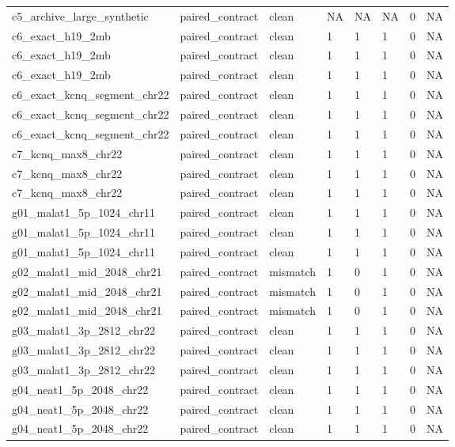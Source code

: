 \begin{tabular}{llllllll}
c5\_archive\_large\_synthetic & paired\_contract & clean & NA & NA & NA & 0 & NA \\
c6\_exact\_h19\_2mb & paired\_contract & clean & 1 & 1 & 1 & 0 & NA \\
c6\_exact\_h19\_2mb & paired\_contract & clean & 1 & 1 & 1 & 0 & NA \\
c6\_exact\_h19\_2mb & paired\_contract & clean & 1 & 1 & 1 & 0 & NA \\
c6\_exact\_kcnq\_segment\_chr22 & paired\_contract & clean & 1 & 1 & 1 & 0 & NA \\
c6\_exact\_kcnq\_segment\_chr22 & paired\_contract & clean & 1 & 1 & 1 & 0 & NA \\
c6\_exact\_kcnq\_segment\_chr22 & paired\_contract & clean & 1 & 1 & 1 & 0 & NA \\
c7\_kcnq\_max8\_chr22 & paired\_contract & clean & 1 & 1 & 1 & 0 & NA \\
c7\_kcnq\_max8\_chr22 & paired\_contract & clean & 1 & 1 & 1 & 0 & NA \\
c7\_kcnq\_max8\_chr22 & paired\_contract & clean & 1 & 1 & 1 & 0 & NA \\
g01\_malat1\_5p\_1024\_chr11 & paired\_contract & clean & 1 & 1 & 1 & 0 & NA \\
g01\_malat1\_5p\_1024\_chr11 & paired\_contract & clean & 1 & 1 & 1 & 0 & NA \\
g01\_malat1\_5p\_1024\_chr11 & paired\_contract & clean & 1 & 1 & 1 & 0 & NA \\
g02\_malat1\_mid\_2048\_chr21 & paired\_contract & mismatch & 1 & 0 & 1 & 0 & NA \\
g02\_malat1\_mid\_2048\_chr21 & paired\_contract & mismatch & 1 & 0 & 1 & 0 & NA \\
g02\_malat1\_mid\_2048\_chr21 & paired\_contract & mismatch & 1 & 0 & 1 & 0 & NA \\
g03\_malat1\_3p\_2812\_chr22 & paired\_contract & clean & 1 & 1 & 1 & 0 & NA \\
g03\_malat1\_3p\_2812\_chr22 & paired\_contract & clean & 1 & 1 & 1 & 0 & NA \\
g03\_malat1\_3p\_2812\_chr22 & paired\_contract & clean & 1 & 1 & 1 & 0 & NA \\
g04\_neat1\_5p\_2048\_chr22 & paired\_contract & clean & 1 & 1 & 1 & 0 & NA \\
g04\_neat1\_5p\_2048\_chr22 & paired\_contract & clean & 1 & 1 & 1 & 0 & NA \\
g04\_neat1\_5p\_2048\_chr22 & paired\_contract & clean & 1 & 1 & 1 & 0 & NA \\

\end{tabular}
